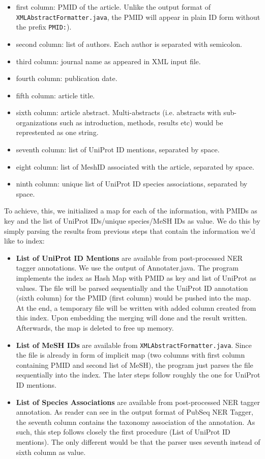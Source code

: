 \begin{itemize}
\item first column: PMID of the article. Unlike the output format of \texttt{XMLAbstractFormatter.java}, the PMID will appear in plain ID form without the prefix \texttt{PMID:}).
\item second column: list of authors. Each author is separated with semicolon.
\item third column: journal name as appeared in XML input file.
\item fourth column: publication date.
\item fifth column: article title.
\item sixth column: article abstract. Multi-abstracts (i.e. abstracts with sub-organizations such as introduction, methods, results etc) would be represtented as one string.
\item seventh column: list of UniProt ID mentions, separated by space.
\item eight column: list of MeshID associated with the article, separated by space.
\item ninth column: unique list of UniProt ID species associations, separated by space.
\end{itemize}

To achieve, this, we initialized a map for each of the information, with PMIDs as key and the list of UniProt IDs/unique species/MeSH IDs as value. We do this by simply parsing the results from previous steps that contain the information we'd like to index:

\begin{itemize}
\item \textbf{List of UniProt ID Mentions} are available from post-processed NER tagger annotations. We use the output of Annotater.java. The program implements the index as Hash Map with PMID as key and list of UniProt as values. The file will be parsed sequentially and the UniProt ID annotation (sixth column) for the PMID (first column) would be pushed into the map. At the end, a temporary file will be written with added column created from this index. Upon embedding the merging will done and the result written. Afterwards, the map is deleted to free up memory.
\item \textbf{List of MeSH IDs} are available from \texttt{XMLAbstractFormatter.java}. Since the file is already in form of implicit map (two columns with first column containing PMID and second list of MeSH), the program just parses the file sequentially into the index. The later steps follow roughly the one for UniProt ID mentions.
\item \textbf{List of Species Associations} are available from post-processed NER tagger annotation. As reader can see in the output format of PubSeq NER Tagger, the seventh column contains the taxonomy association of the annotation. As such, this step follows closely the first procedure (List of UniProt ID mentions). The only different would be that the parser uses seventh instead of sixth column as value.
\end{itemize}

